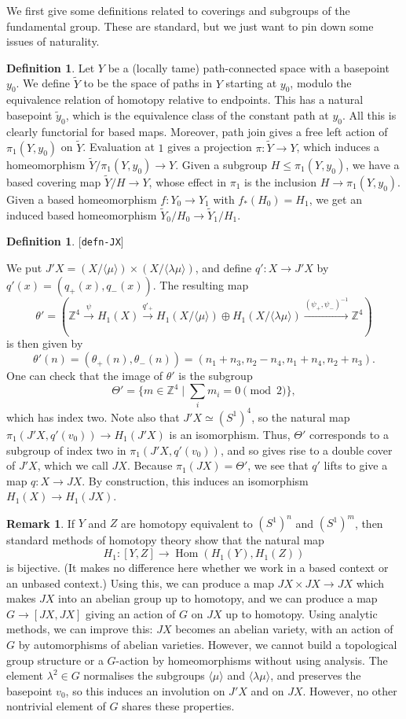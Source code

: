 \documentclass[reqno]{amsart}
\newcommand{\lbl}[1]{\label{#1}\textup{[\texttt{#1}]}\par}
\newcommand{\lbl}{\label}
\newcommand{\Hom}	{\operatorname{Hom}}
\newcommand{\Tht}       {\Theta}
\newcommand{\tht}       {\theta}
\newcommand{\lm}        {\lambda}
\newcommand{\xra}       {\xrightarrow}
\newcommand{\Z}         {{\mathbb{Z}}}
\newcommand{\ip}[1]     {\langle #1\rangle}
\newcommand{\st}        {\;|\;}
\newcommand{\tm}        {\times}
\newcommand{\tY}	{\widetilde{Y}}
\newcommand{\ty}	{\widetilde{y}}
\renewcommand{\:}{\colon}
\theoremstyle{definition}
\newtheorem{remark}[theorem]{Remark}
\newtheorem{definition}[theorem]{Definition}
\begin{document}
We first give some definitions related to coverings and subgroups of
the fundamental group.  These are standard, but we just want to pin
down some issues of naturality.
\begin{definition}
 Let $Y$ be a (locally tame) path-connected space with a basepoint
 $y_0$.  We define $\tY$ to be the space of paths in $Y$ starting at
 $y_0$, modulo the equivalence relation of homotopy relative to
 endpoints.  This has a natural basepoint $\ty_0$, which is the
 equivalence class of the constant path at $y_0$.  All this is clearly
 functorial for based maps.  Moreover, path join gives a free left
 action of $\pi_1(Y,y_0)$ on $\tY$.  Evaluation at $1$ gives a
 projection $\pi\:\tY\to Y$, which induces a homeomorphism
 $\tY/\pi_1(Y,y_0)\to Y$.  Given a subgroup $H\leq\pi_1(Y,y_0)$, we
 have a based covering map $\tY/H\to Y$, whose effect in $\pi_1$ is
 the inclusion $H\to\pi_1(Y,y_0)$.  Given a based homeomorphism
 $f\:Y_0\to Y_1$ with $f_*(H_0)=H_1$, we get an induced based
 homeomorphism $\tY_0/H_0\to\tY_1/H_1$.
\end{definition}

\begin{definition}\lbl{defn-JX}
 We put $J'X=(X/\ip{\mu})\tm(X/\ip{\lm\mu})$, and define
 $q'\:X\to J'X$ by $q'(x)=(q_+(x),q_-(x))$.  The resulting map
 \[ \tht' = (\Z^4 \xra{\psi} H_1(X)
                  \xra{q'_+} H_1(X/\ip{\mu})\oplus H_1(X/\ip{\lm\mu})
                  \xra{(\psi_+,\psi_-)^{-1}} \Z^4)
 \]
 is then given by
 \[ \tht'(n) = (\tht_+(n),\tht_-(n))
     = (n_1+n_3,n_2-n_4,n_1+n_4,n_2+n_3).
 \]
 One can check that the image of $\tht'$ is the subgroup
 \[ \Tht' = \{m\in\Z^4\st\sum_im_i = 0\pmod{2}\}, \]
 which has index two.  Note also that $J'X\simeq(S^1)^4$, so the natural
 map $\pi_1(J'X,q'(v_0))\to H_1(J'X)$ is an isomorphism.  Thus, $\Tht'$
 corresponds to a subgroup of index two in $\pi_1(J'X,q'(v_0))$, and
 so gives rise to a double cover of $J'X$, which we call $JX$.
 Because $\pi_1(JX)=\Tht'$, we see that $q'$ lifts to give a map
 $q\:X\to JX$.  By construction, this induces an isomorphism
 $H_1(X)\to H_1(JX)$.
\end{definition}

\begin{remark}
 If $Y$ and $Z$ are homotopy equivalent to $(S^1)^n$ and $(S^1)^m$,
 then standard methods of homotopy theory show that the natural map
 \[ H_1 \: [Y,Z] \to \Hom(H_1(Y),H_1(Z)) \]
 is bijective.  (It makes no difference here whether we work in a
 based context or an unbased context.)  Using this, we can produce a
 map $JX\tm JX\to JX$ which makes $JX$ into an abelian group up to
 homotopy, and we can produce a map $G\to[JX,JX]$ giving an action of
 $G$ on $JX$ up to homotopy.  Using analytic methods, we can improve
 this: $JX$ becomes an abelian variety, with an action of $G$ by
 automorphisms of abelian varieties.  However, we cannot
 build a topological group structure or a $G$-action by homeomorphisms
 without using analysis.  The element $\lm^2\in G$ normalises the
 subgroups $\ip{\mu}$ and $\ip{\lm\mu}$, and preserves the basepoint
 $v_0$, so this induces an involution on $J'X$ and on $JX$.  However,
 no other nontrivial element of $G$ shares these properties.
\end{remark}
\end{document}
